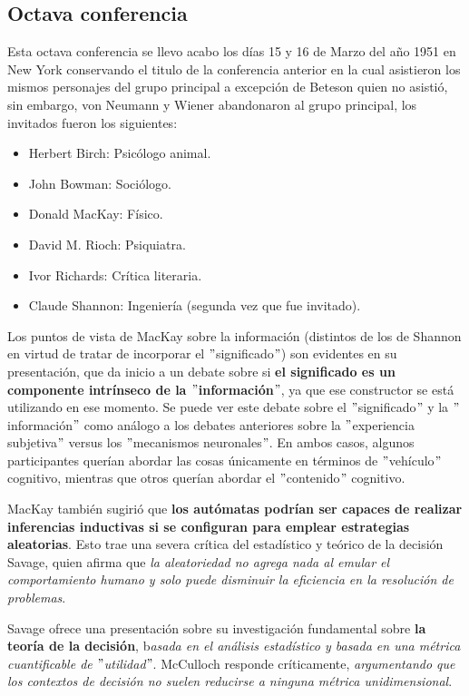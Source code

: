 \documentclass[11pt]{article}
\begin{document}
 		\subsection{Octava conferencia}
		Esta octava conferencia se llevo acabo los días 15 y 16 de Marzo del año 1951 en New York conservando el titulo de la conferencia anterior en la cual asistieron los mismos personajes del grupo principal a excepción de Beteson quien no asistió, sin embargo, von Neumann y Wiener abandonaron al grupo principal, los invitados fueron los siguientes:
		\begin{itemize}
    		\item Herbert Birch: Psicólogo animal.
    		\item John Bowman: Sociólogo.
    		\item Donald MacKay: Físico.
    		\item David M. Rioch: Psiquiatra.
    		\item Ivor Richards: Crítica literaria.
    		\item Claude Shannon: Ingeniería (segunda vez que fue invitado).
		\end{itemize}
 		Los puntos de vista de MacKay sobre la información (distintos de los de Shannon en virtud de tratar de incorporar el $"$significado$"$) son evidentes en su presentación, que da inicio a un debate sobre si \textbf{el significado es un componente intrínseco de la $"$información$"$}, ya que ese constructor se está utilizando en ese momento. Se puede ver este debate sobre el $"$significado$"$ y la $"$información$"$ como análogo a los debates anteriores sobre la $"$experiencia subjetiva$"$ versus los $"$mecanismos neuronales$"$. En ambos casos, algunos participantes querían abordar las cosas únicamente en términos de $"$vehículo$"$ cognitivo, mientras que otros querían abordar el $"$contenido$"$ cognitivo.\par
		MacKay también sugirió que \textbf{los autómatas podrían ser capaces de realizar inferencias inductivas si se configuran para emplear estrategias aleatorias}. Esto trae una severa crítica del estadístico y teórico de la decisión Savage, quien afirma que \textit{la aleatoriedad no agrega nada al emular el comportamiento humano y solo puede disminuir la eficiencia en la resolución de problemas}.\par
		Savage ofrece una presentación sobre su investigación fundamental sobre \textbf{la teoría de la decisión}, b\textit{asada en el análisis estadístico y basada en una métrica cuantificable de $"$utilidad$"$}. McCulloch responde críticamente, \textit{argumentando que los contextos de decisión no suelen reducirse a ninguna métrica unidimensional}.\par
\end{document}
